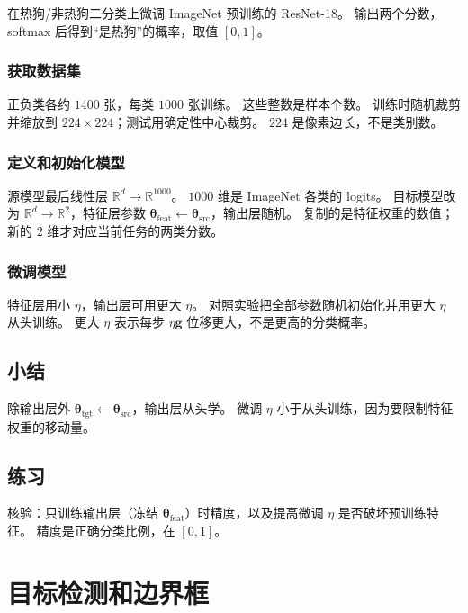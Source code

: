 在热狗/非热狗二分类上微调 ImageNet 预训练的 ResNet-18。
输出两个分数，softmax 后得到“是热狗”的概率，取值 $[0,1]$。

\subsubsection{获取数据集}

正负类各约 $1400$ 张，每类 $1000$ 张训练。
这些整数是样本个数。
训练时随机裁剪并缩放到 $224\times 224$；测试用确定性中心裁剪。
$224$ 是像素边长，不是类别数。

\subsubsection{定义和初始化模型}

源模型最后线性层 $\mathbb{R}^{d}\to\mathbb{R}^{1000}$。
$1000$ 维是 ImageNet 各类的 logits。
目标模型改为 $\mathbb{R}^{d}\to\mathbb{R}^{2}$，特征层参数 $\bm{\theta}_{\mathrm{feat}}\leftarrow\bm{\theta}_{\mathrm{src}}$，输出层随机。
复制的是特征权重的数值；新的 $2$ 维才对应当前任务的两类分数。

\subsubsection{微调模型}

特征层用小 $\eta$，输出层可用更大 $\eta$。
对照实验把全部参数随机初始化并用更大 $\eta$ 从头训练。
更大 $\eta$ 表示每步 $\eta\bm{g}$ 位移更大，不是更高的分类概率。

\subsection{小结}

除输出层外 $\bm{\theta}_{\mathrm{tgt}}\leftarrow\bm{\theta}_{\mathrm{src}}$，输出层从头学。
微调 $\eta$ 小于从头训练，因为要限制特征权重的移动量。

\subsection{练习}

核验：只训练输出层（冻结 $\bm{\theta}_{\mathrm{feat}}$）时精度，以及提高微调 $\eta$ 是否破坏预训练特征。
精度是正确分类比例，在 $[0,1]$。

\section{目标检测和边界框}

